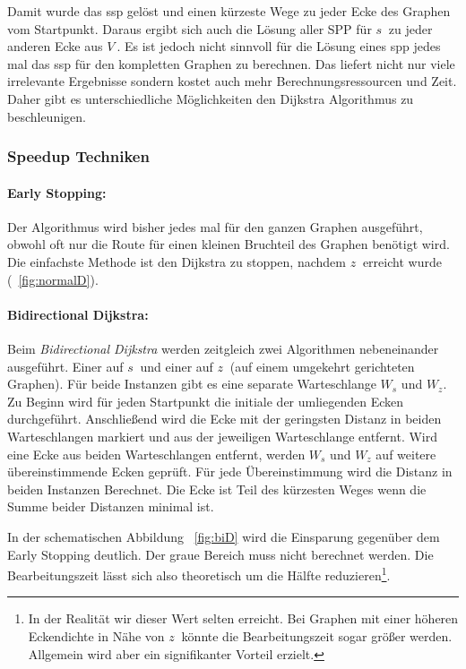 Damit wurde das \gls{ssp} gelöst und einen kürzeste Wege zu jeder Ecke des Graphen vom Startpunkt. Daraus ergibt sich auch die Lösung aller SPP für $s~$ zu jeder anderen Ecke aus $V~$. Es ist jedoch nicht sinnvoll für die Lösung eines \gls{spp} jedes mal das \gls{ssp} für den kompletten Graphen zu berechnen. Das liefert nicht nur viele irrelevante Ergebnisse sondern kostet auch mehr Berechnungsressourcen und Zeit. Daher gibt es unterschiedliche Möglichkeiten den Dijkstra Algorithmus zu beschleunigen.

\subsubsection{Speedup Techniken}

\paragraph*{Early Stopping:}
Der Algorithmus wird bisher jedes mal für den ganzen Graphen ausgeführt, obwohl oft nur die Route für einen kleinen Bruchteil des Graphen benötigt wird. Die einfachste Methode ist den Dijkstra zu stoppen, nachdem $z~$ erreicht wurde (~\ref{fig:normalD}). 


\paragraph*{Bidirectional Dijkstra:}
Beim \textit{Bidirectional Dijkstra} werden zeitgleich zwei Algorithmen nebeneinander ausgeführt. Einer auf $s~$ und einer auf $z~$ (auf einem umgekehrt gerichteten Graphen). Für beide Instanzen gibt es eine separate Warteschlange $W_{s}$ und $W_{z}$. Zu Beginn wird für jeden Startpunkt die initiale der umliegenden Ecken durchgeführt. Anschließend wird die Ecke mit der geringsten Distanz in beiden Warteschlangen markiert und aus der jeweiligen Warteschlange entfernt. Wird eine Ecke aus beiden Warteschlangen entfernt, werden $W_{s}$ und $W_{z}$ auf weitere übereinstimmende Ecken geprüft. Für jede Übereinstimmung wird die Distanz in beiden Instanzen Berechnet. Die Ecke ist Teil des kürzesten Weges wenn die Summe beider Distanzen minimal ist.\par
In der schematischen Abbildung ~\ref{fig:biD} wird die Einsparung gegenüber dem Early Stopping deutlich. Der graue Bereich muss nicht berechnet werden. Die Bearbeitungszeit lässt sich also theoretisch um die Hälfte reduzieren\footnote{In der Realität wir dieser Wert selten erreicht. Bei Graphen mit einer höheren Eckendichte in Nähe von $z~$ könnte die Bearbeitungszeit sogar größer werden. Allgemein wird aber ein signifikanter Vorteil erzielt.}.

